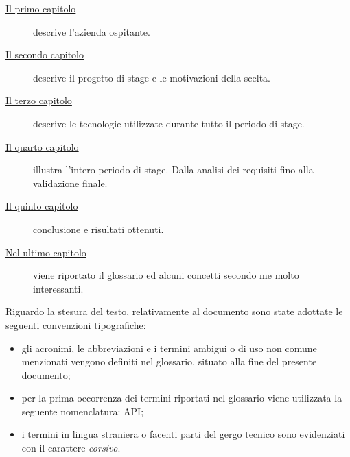 \begin{description}
	\item[{\hyperref[cap:introduzione]{Il primo capitolo}}] descrive l’azienda ospitante.
	
	\item[{\hyperref[cap:progetto]{Il secondo capitolo}}] descrive il progetto di stage e le motivazioni della scelta.
	
	\item[{\hyperref[cap:Tecnologie utilizzate]{Il terzo capitolo}}] descrive le tecnologie utilizzate durante
	tutto il periodo di stage.

	\item[{\hyperref[cap:progettazione]{Il quarto capitolo}}] illustra l'intero periodo di stage. Dalla analisi dei requisiti fino alla validazione finale. 	
	
	\item[{\hyperref[cap:conclusioni]{Il quinto capitolo}}] conclusione e risultati ottenuti.
	
	\item[{\hyperref[cap:conclusioni]{Nel ultimo capitolo}}] viene riportato il glossario ed alcuni concetti secondo me molto interessanti.
\end{description}
Riguardo la stesura del testo, relativamente al documento sono state adottate le seguenti convenzioni tipografiche:
\begin{itemize}
	\item gli acronimi, le abbreviazioni e i termini ambigui o di uso non comune menzionati vengono definiti nel glossario, situato alla fine del presente documento;
	\item per la prima occorrenza dei termini riportati nel glossario viene utilizzata la seguente nomenclatura: \gls{API};
	\item i termini in lingua straniera o facenti parti del gergo tecnico sono evidenziati con il carattere \emph{corsivo}.
\end{itemize}
\endgroup			
\vfill

